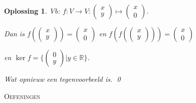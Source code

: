 \documentclass[a4paper,12pt]{article}
\newtheorem{oplossing}{Oplossing}
\begin{document}
\begin{enumerate}
\begin{itemize}
\begin{oplossing}
        Vb: \(f: V \to V: \begin{pmatrix}
            x \\
            y
        \end{pmatrix}
        \mapsto
        \begin{pmatrix}
            x \\
            0
        \end{pmatrix}
         \).

         Dan is \(f \left(\begin{pmatrix}
            x \\
            y
        \end{pmatrix}\right)
        = \begin{pmatrix}
            x \\
            0
        \end{pmatrix}
         \)
        en \(f\left(f \left(\begin{pmatrix}
            x \\
            y
        \end{pmatrix}\right)\right)
        = \begin{pmatrix}
            x \\
            0
        \end{pmatrix}
         \)

         en \(\ker f = \{\begin{pmatrix}
            0 \\
            y
        \end{pmatrix} | y \in \mathbb{R}\}\).

        Wat opnieuw een tegenvoorbeeld is. \qed
    \end{oplossing}
\end{itemize}

\newpage

\begin{center}
    \textsc{Oefeningen}
\end{center}


\vspace{0.5cm}


\end{enumerate}
\end{document}
